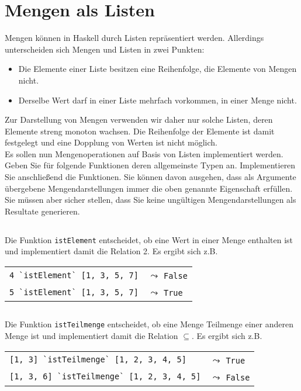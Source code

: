 \documentclass[
  10pt,                   %
  DIV12,
  german,                 %
  oneside,                %
  parskip=half,           %
  headings=normal,        %
  captions=tableheading,  %
]{scrartcl}
\begin{document}
\renewcommand*\thesubsection{\alph{subsection})}
\section{Mengen als Listen}
Mengen können in Haskell durch Listen repräsentiert werden. Allerdings unterscheiden
sich Mengen und Listen in zwei Punkten:
\begin{itemize}
  \item Die Elemente einer Liste besitzen eine Reihenfolge, die Elemente von Mengen
nicht.
\item Derselbe Wert darf in einer Liste mehrfach vorkommen, in einer Menge nicht.
\end{itemize}
Zur Darstellung von Mengen verwenden wir daher nur solche Listen, deren Elemente
streng monoton wachsen. Die Reihenfolge der Elemente ist damit festgelegt und eine
Dopplung von Werten ist nicht möglich.\\

Es sollen nun Mengenoperationen auf Basis von Listen implementiert werden. Geben Sie
für folgende Funktionen deren allgemeinste Typen an. Implementieren Sie anschließend
die Funktionen. Sie können davon ausgehen, dass als Argumente übergebene Mengendarstellungen
immer die oben genannte Eigenschaft erfüllen. Sie müssen aber sicher
stellen, dass Sie keine ungültigen Mengendarstellungen als Resultate generieren.
\subsection{}
Die Funktion \lstinline|istElement| entscheidet, ob eine Wert in einer
Menge enthalten ist und implementiert damit die Relation 2. Es ergibt sich z.B.
\begin{center}
\begin{tabular}{ll}
\lstinline|4 `istElement` [1, 3, 5, 7]| & $\leadsto$ \lstinline|False|\\
\lstinline|5 `istElement` [1, 3, 5, 7]| & $\leadsto$ \lstinline|True|
\end{tabular}
\end{center}
\subsection{}
Die Funktion \lstinline|istTeilmenge| entscheidet, ob eine Menge Teilmenge einer anderen Menge ist und implementiert damit die Relation $\subseteq$. Es ergibt sich z.B.
\begin{center}
\begin{tabular}{ll}
\lstinline|[1, 3] `istTeilmenge` [1, 2, 3, 4, 5]| & $\leadsto$ \lstinline|True|\\
\lstinline|[1, 3, 6] `istTeilmenge` [1, 2, 3, 4, 5]| & $\leadsto$ \lstinline|False|
\end{tabular}
\end{center}
\end{document}
